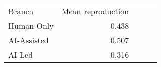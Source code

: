 \begin{tabular}{lrrrr}
\hline\hline
Branch & Mean reproduction \\
Human-Only & 0.438 \\
AI-Assisted & 0.507 \\
AI-Led & 0.316 \\
\hline\hline
\end{tabular}
